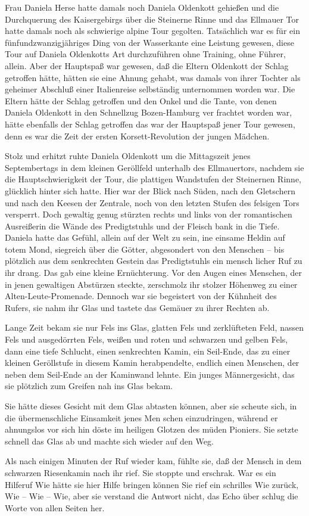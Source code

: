 Frau Daniela Herse hatte damals noch Daniela Oldenkott
gehießen und die Durchquerung des Kaisergebirgs über die
Steinerne Rinne und das Ellmauer Tor hatte damals noch
als schwierige alpine Tour gegolten. Tatsächlich war es für
ein fünfundzwanzigjähriges Ding von der Wasserkante eine
Leistung gewesen, diese Tour auf Daniela Oldenkotts Art
durchzuführen\dopp{} ohne Training, ohne Führer, allein. Aber der
Hauptspaß war gewesen, daß die Eltern Oldenkott der Schlag
getroffen hätte, hätten sie eine Ahnung gehabt, was damals
von ihrer Tochter als geheimer Abschluß einer Italienreise
selbständig unternommen worden war. Die Eltern hätte der
Schlag getroffen und den Onkel und die Tante, von denen
Daniela Oldenkott in den Schnellzug Bozen-Hamburg ver\-%
frachtet worden war, hätte ebenfalls der Schlag getroffen\dopp{}
das war der Hauptspaß jener Tour gewesen, denn es war die
Zeit der ersten Korsett-Revolution der jungen Mädchen.

Stolz und erhitzt ruhte Daniela Oldenkott um die Mittagszeit
jenes Septembertags in dem kleinen Geröllfeld unterhalb
des Ellmauertors, nachdem sie die Hauptschwierigkeit der
Tour, die plattigen Wandstufen der Steinernen Rinne,
glücklich hinter sich hatte. Hier war der Blick nach Süden,
nach den Gletschern und nach den Keesen der Zentrale,
noch von den letzten Stufen des felsigen Tors versperrt. Doch
gewaltig genug stürzten rechts und links von der romantischen
Ausreißerin die Wände des Predigtstuhls und der Fleisch\-%
bank in die Tiefe. Daniela hatte das Gefühl, allein auf der
Welt zu sein, ine einsame Heldin auf totem Mond, siegreich
über die Götter, abgesondert von den Menschen -- bis plötzlich
aus dem senkrechten Gestein das Predigtstuhls ein mensch\-%
licher Ruf zu ihr drang. Das gab eine kleine Ernüchterung.
Vor den Augen eines Menschen, der in jenen gewaltigen
Abstürzen steckte, zerschmolz ihr stolzer Höhenweg zu einer
Alten-Leute-Promenade. Dennoch war sie begeistert von der
Kühnheit des Rufers, sie nahm ihr Glas und tastete das
Gemäuer zu ihrer Rechten ab.

Lange Zeit bekam sie nur Fels ins Glas, glatten Fels und
zerklüfteten Feld, nassen Fels und ausgedörrten Fels, weißen
und roten und schwarzen und gelben Fels, dann eine tiefe
Schlucht, einen senkrechten Kamin, ein Seil-Ende, das zu
einer kleinen Geröllstufe in diesem Kamin herabpendelte,
endlich einen Menschen, der neben dem Seil-Ende an der
Kaminwand lehnte. Ein junges Männergesicht, das sie plötzlich
zum Greifen nah ins Glas bekam.

Sie hätte dieses Gesicht mit dem Glas abtasten können, aber
sie scheute sich, in die übermenschliche Einsamkeit jenes Men\-%
schen einzudringen, während er ahnungslos vor sich hin döste
im heiligen Glotzen des müden Pioniers. Sie setzte schnell das
Glas ab und machte sich wieder auf den Weg.

Als nach einigen Minuten der Ruf wieder kam, fühlte sie, daß
der Mensch in dem schwarzen Riesenkamin nach ihr rief. Sie
stoppte und erschrak. War es ein Hilferuf\frag{} Wie hätte sie hier
Hilfe bringen können\frag{} Sie rief ein schrilles Wie zurück, Wie --
Wie -- Wie, aber sie verstand die Antwort nicht, das Echo über\-%
schlug die Worte von allen Seiten her.


